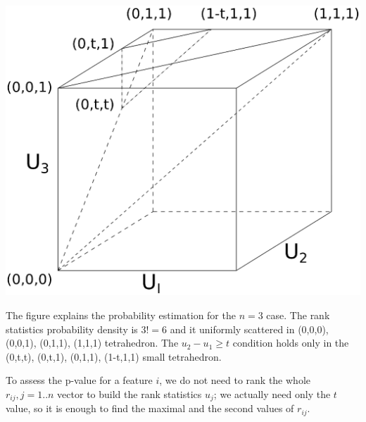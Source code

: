 \documentclass{llncs}
\begin{document}
\includegraphics[scale=.5,trim=0 10cm 0 0, clip=true]{rank3d-nocolour}

The figure explains the probability estimation for the $n=3$ case. The rank statistics probability density is $3!=6$ and it uniformly scattered in (0,0,0), (0,0,1), (0,1,1), (1,1,1) tetrahedron. The $u_2 - u_1 \ge t$ condition holds only in the (0,t,t), (0,t,1), (0,1,1), (1-t,1,1) small tetrahedron.

To assess the p-value for a feature $i$, we do not need to rank the whole $r_{ij}, j=1..n$ vector to build the rank statistics $u_j$; we actually need only the $t$ value, so it is enough to find the maximal and the second values of $r_{ij}$.




\end{document}
